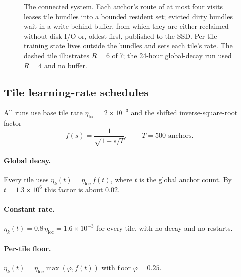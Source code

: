 \documentclass[10pt]{article}
\begin{document}
\begin{figure}[t]
\caption{The connected system. Each anchor's route of at most four visits leases tile bundles into a
bounded resident set; evicted dirty bundles wait in a write-behind buffer, from which they are either
reclaimed without disk I/O or, oldest first, published to the SSD. Per-tile training state lives
outside the bundles and sets each tile's rate. The dashed tile illustrates $R=6$ of 7; the 24-hour
global-decay run used $R=4$ and no buffer.}
\label{fig:system}
\end{figure}

\subsection{Tile learning-rate schedules}
\label{sec:schedules}

All runs use base tile rate $\eta_{\text{loc}}=2\times10^{-3}$ and the shifted inverse-square-root
factor~\citep{vaswani2017attention}
\begin{equation}
  f(s) = \frac{1}{\sqrt{1+s/T}}, \qquad T = 500 \text{ anchors}.
\end{equation}

\paragraph{Global decay.} Every tile uses $\eta_k(t)=\eta_{\text{loc}}\,f(t)$, where $t$ is the global anchor
count. By $t=1.3\times10^6$ this factor is about 0.02.

\paragraph{Constant rate.} $\eta_k(t)=0.8\,\eta_{\text{loc}}=1.6\times10^{-3}$ for every tile, with
no decay and no restarts.

\paragraph{Per-tile floor.} $\eta_k(t)=\eta_{\text{loc}}\max(\varphi, f(t))$ with floor $\varphi=0.25$.
\end{document}
